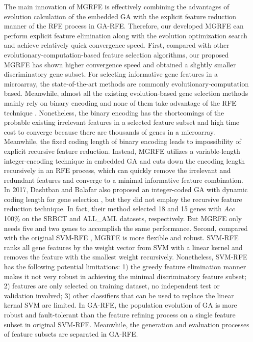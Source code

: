 \documentclass[10pt,journal,compsoc]{IEEEtran}
\begin{document}
	The main innovation of MGRFE is effectively combining the advantages of evolution calculation of the embedded GA with the explicit feature reduction manner of the RFE process in GA-RFE. Therefore, our developed MGRFE can perform explicit feature elimination along with the evolution optimization search and achieve relatively quick convergence speed.
	First, compared with other evolutionary-computation-based feature selection algorithms, our proposed MGRFE has shown higher convergence speed and obtained a slightly smaller discriminatory gene subset. For selecting informative gene features in a microarray, the state-of-the-art methods are commonly evolutionary-computation based. Meanwhile, almost all the existing evolution-based gene selection methods mainly rely on binary encoding and none of them take advantage of the RFE technique \cite{RN435,P33,RN437,W15,P32,RN438,RN416}. Nonetheless, the binary encoding has the shortcomings of the probable existing irrelevant features in a selected feature subset and high time cost to converge because there are thousands of genes in a microarray. Meanwhile, the fixed coding length of binary encoding leads to impossibility of explicit recursive feature reduction. Instead, MGRFE utilizes a variable-length integer-encoding technique in embedded GA and cuts down the encoding length recursively in an RFE process, which can quickly remove the irrelevant and redundant features and converge to a minimal informative feature combination. In 2017, Dashtban and Balafar also proposed an integer-coded GA with dynamic coding length for gene selection \cite{P33}, but they did not employ the recursive feature reduction technique. In fact, their method selected 18 and 15 genes with $Acc$ 100\% on the SRBCT and ALL\_AML datasets, respectively. But MGRFE only needs five and two genes to accomplish the same performance. 
	Second, compared with the original SVM-RFE \cite{P1}, MGRFE is more flexible and robust. SVM-RFE ranks all gene features by the weight vector from SVM with a linear kernel and removes the feature with the smallest weight recursively. Nonetheless, SVM-RFE has the following potential limitations: 1) the greedy feature elimination manner makes it not very robust in achieving the minimal discriminatory feature subset; 2) features are only selected on training dataset, no independent test or validation involved; 3) other classifiers that can be used to replace the linear kernal SVM are limited. 
	In GA-RFE, the population evolution of GA is more robust and fault-tolerant than the feature refining process on a single feature subset in original SVM-RFE. Meanwhile, the generation and evaluation processes of feature subsets are separated in GA-RFE. 
\end{document}
